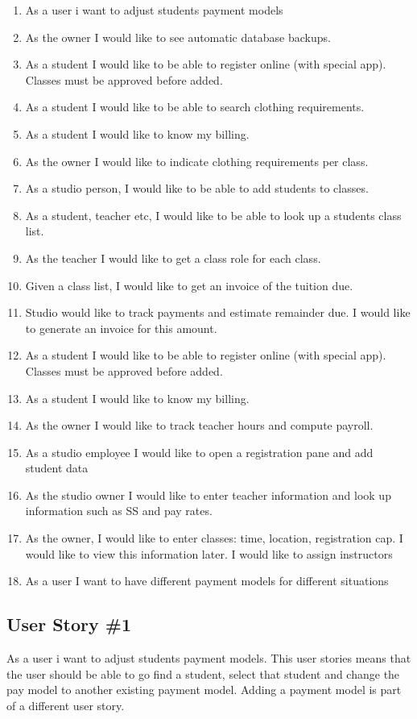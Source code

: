 \begin{enumerate}
  \item As a user i want to adjust students payment models
  \item As the owner I would like to see automatic database backups.
  \item As a student I would like to be able to register online (with special app). Classes must be approved before added.
  \item As a student I would like to be able to search clothing requirements.
  \item As a student I would like to know my billing.
  \item As the owner I would like to indicate clothing requirements per class.
  \item As a studio person, I would like to be able to add students to classes.
  \item  As a student, teacher etc, I would like to be able to look up a students class list.
  \item As the teacher I would like to get a class role for each class.
  \item Given a class list, I would like to get an invoice of the tuition due.
  \item Studio would like to track payments and estimate remainder due.  I would like to generate an invoice for this amount.
  \item As a student I would like to be able to register online (with special app).   Classes must be approved before added.
  \item As a student I would like to know my billing.
  \item As the owner I would like to track teacher hours and compute payroll.
  \item As a studio employee I would like to open a registration pane and add student data
  \item As the studio owner I would like to enter teacher information and look up information such as SS and pay rates.
  \item As the owner, I would like to enter classes: time, location, registration cap. I would like to view this information later. I would like to assign instructors
  \item As a user I want to have different payment models for different situations
\end{enumerate}



\subsection{User Story \#1}
As a user i want to adjust students payment models. This user stories means that the user should be able to go find a student, select that student and change the pay model to another existing payment model. Adding a payment model is part of a different user story. 

